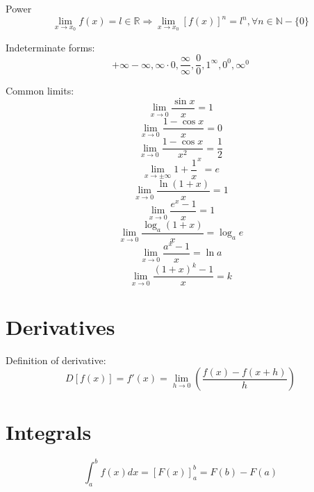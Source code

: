 \documentclass{article}
\begin{document}
Power
\begin{equation}
\lim_{x\to{x_0}} f(x) = l \in \mathbb{R} \Rightarrow \lim_{x\to{x_0}} [f(x)]^n = l^n, \forall n\in \mathbb{N} - \{0\}
\end{equation}

Indeterminate forms:
\begin{equation}
+\infty - \infty, \infty \cdot 0, \frac{\infty}{\infty}, \frac{0}{0}, 1^{\infty}, 0^0, \infty^0
\end{equation}

Common limits:
\begin{equation}
\lim_{x\to{0}} \frac{\sin{x}}{x} = 1
\end{equation}
\begin{equation}
\lim_{x\to{0}} \frac{1-\cos{x}}{x} = 0
\end{equation}
\begin{equation}
\lim_{x\to{0}} \frac{1-\cos{x}}{x^2} = \frac{1}{2}
\end{equation}
\begin{equation}
\lim_{x\to\pm\infty}1+\frac{1}{x}^x=e
\end{equation}
\begin{equation}
\lim_{x\to{0}}\frac{\ln{(1+x)}}{x}=1
\end{equation}
\begin{equation}
\lim_{x\to{0}}\frac{e^x-1}{x}=1
\end{equation}
\begin{equation}
\lim_{x\to{0}}\frac{\log_a{(1+x)}}{x}=\log_a{e}
\end{equation}
\begin{equation}
\lim_{x\to{0}}\frac{a^x-1}{x}=\ln{a}
\end{equation}
\begin{equation}
\lim_{x\to{0}}\frac{(1+x)^k-1}{x}=k
\end{equation}


\section{Derivatives}

Definition of derivative:
\begin{equation}
D[f(x)] = f'(x) = \lim_{h\to0}(\frac{f(x)-f(x+h)}{h})
\end{equation}

\section{Integrals}

\begin{equation}
\int_{a}^{b} f(x) dx = [F(x)]_{a}^{b} = F(b) - F(a)
\end{equation}
\end{document}
